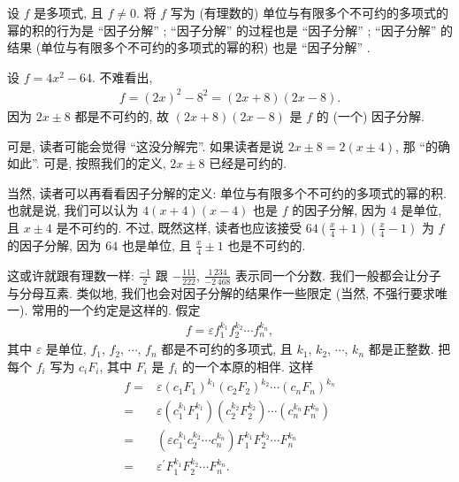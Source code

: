\begin{definition}
    设 $f$ 是多项式, 且 $f \neq 0$. 将 $f$ 写为 (有理数的) 单位与有限多个不可约的多项式的幂的积的行为是 ``因子分解'' ; ``因子分解'' 的过程也是 ``因子分解'' ; ``因子分解'' 的结果 (单位与有限多个不可约的多项式的幂的积) 也是 ``因子分解'' .
\end{definition}

\begin{example}
    设 $f = 4x^2 - 64$. 不难看出,
    \begin{align*}
        f = (2x)^2 - 8^2 = (2x + 8) (2x - 8).
    \end{align*}
    因为 $2x \pm 8$ 都是不可约的, 故 $(2x + 8)(2x - 8)$ 是 $f$ 的 (一个) 因子分解.

    可是, 读者可能会觉得 ``这没分解完''. 如果读者是说 $2x \pm 8 = 2 (x \pm 4)$, 那 ``的确如此''. 可是, 按照我们的定义, $2x \pm 8$ 已经是可约的.

    当然, 读者可以再看看因子分解的定义: 单位与有限多个不可约的多项式的幂的积. 也就是说, 我们可以认为 $4 (x + 4) (x - 4)$ 也是 $f$ 的因子分解, 因为 $4$ 是单位, 且 $x \pm 4$ 是不可约的. 不过, 既然这样, 读者也应该接受 $64 \left( \frac{x}{4} + 1 \right) \left( \frac{x}{4} - 1 \right) $ 为 $f$ 的因子分解, 因为 $64$ 也是单位, 且 $\frac{x}{4} \pm 1$ 也是不可约的.

    这或许就跟有理数一样: $\frac{-1}{2}$ 跟 $-\frac{111}{222}$, $\frac{1\,234}{-2\,468}$ 表示同一个分数. 我们一般都会让分子与分母互素. 类似地, 我们也会对因子分解的结果作一些限定 (当然, 不强行要求唯一). 常用的一个约定是这样的. 假定
    \begin{align*}
        f = \varepsilon f_1^{k_1} f_2^{k_2} \cdots f_n^{k_n},
    \end{align*}
    其中 $\varepsilon$ 是单位, $f_1$, $f_2$, $\cdots$, $f_n$ 都是不可约的多项式, 且 $k_1$, $k_2$, $\cdots$, $k_n$ 都是正整数. 把每个 $f_i$ 写为 $c_i F_i$, 其中 $F_i$ 是 $f_i$ 的一个本原的相伴. 这样
    \begin{align*}
        f
        = {} & \varepsilon (c_1 F_1)^{k_1} (c_2 F_2)^{k_2} \cdots (c_n F_n)^{k_n}                      \\
        = {} & \varepsilon (c_1^{k_1} F_1^{k_1}) (c_2^{k_2} F_2^{k_2}) \cdots (c_n^{k_n} F_n^{k_n})    \\
        = {} & (\varepsilon c_1^{k_1} c_2^{k_2} \cdots c_n^{k_n}) F_1^{k_1} F_2^{k_2} \cdots F_n^{k_n} \\
        = {} & \varepsilon^{\prime} F_1^{k_1} F_2^{k_2} \cdots F_n^{k_n}.
    \end{align*}


\end{example}
